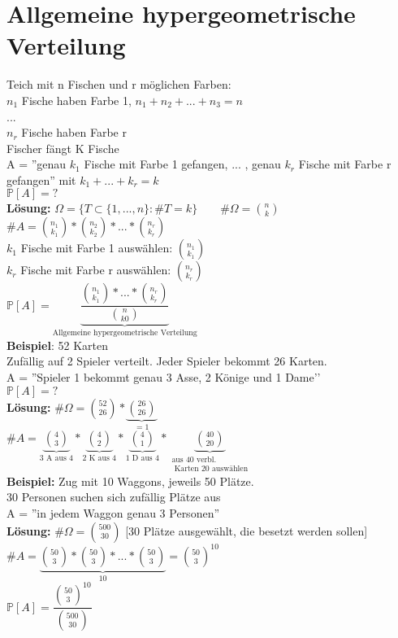 \section{Allgemeine hypergeometrische Verteilung}
Teich mit n Fischen und r möglichen Farben:\medskip\\
$n_1$ Fische haben Farbe 1, \hspace{1cm} $n_1 + n_2 +...+n_3 = n$\\
...\\
$n_r$ Fische haben Farbe r\medskip\\
Fischer fängt K Fische\\
 A = ''genau $k_1$ Fische mit Farbe 1 gefangen, ... , genau $k_r$ Fische mit Farbe r gefangen'' mit $k_1 + ... + k_r = k$\medskip\\
 $\mathds{P}[A] = ?$\medskip\\
 \textbf{Lösung:} $\Omega = \{ T \subset \{1,...,n\}:\#T=k\} \qquad \#\Omega = \binom{n}{k}$\medskip\\
 $\#A = \binom{n_1}{k_1} * \binom{n_2}{k_2}*...*\binom{n_r}{k_r}$\medskip\\
 $k_1$ Fische mit Farbe 1 auswählen: $\binom{n_1}{k_1}$\\
 $k_r$ Fische mit Farbe r auswählen: $\binom{n_r}{k_r}$\medskip\\
 $\mathds{P}[A] = \underbrace{\dfrac{\binom{n_1}{k_1}*...*\binom{n_r}{k_r}}{\binom{n}{k0}}}_\text{Allgemeine hypergeometrische Verteilung}$\medskip\\
 \textbf{Beispiel}: 52 Karten\\
 Zufällig auf 2 Spieler verteilt. Jeder Spieler bekommt 26 Karten.\medskip\\
 A = ''Spieler 1 bekommt genau 3 Asse, 2 Könige und 1 Dame'\smallskip'\\
 $\mathds{P}[A] = ?$\medskip\\
 \textbf{Lösung:} $\#\Omega = \binom{52}{26} * \underbrace{\binom{26}{26}}_{=1}$\medskip\\
 $\#A=\underbrace{\binom{4}{3}}_\text{3 A aus 4}*\underbrace{\binom{4}{2}}_\text{2 K aus 4}*\underbrace{\binom{4}{1}}_\text{1 D aus 4}*\underbrace{\binom{40}{20}}_{\substack{\text{aus 40 verbl.}\\\text{ Karten 20 auswählen}}}$\medskip\\
 \textbf{Beispiel:} Zug mit 10 Waggons, jeweils 50 Plätze.\\
 30 Personen suchen sich zufällig Plätze aus\smallskip\\
 A = ''in jedem Waggon genau 3 Personen''\medskip\\
 \textbf{Lösung:} $\#\Omega = \binom{500}{30}$ [30 Plätze ausgewählt, die besetzt werden sollen]\medskip\\
 $\#A = \underbrace{\binom{50}{3}*\binom{50}{3}*...*\binom{50}{3}}_10 = \binom{50}{3}^{10}$\smallskip\\
 $\mathds{P}[A] = \dfrac{\binom{50}{3}^{10}}{\binom{500}{30}}$
